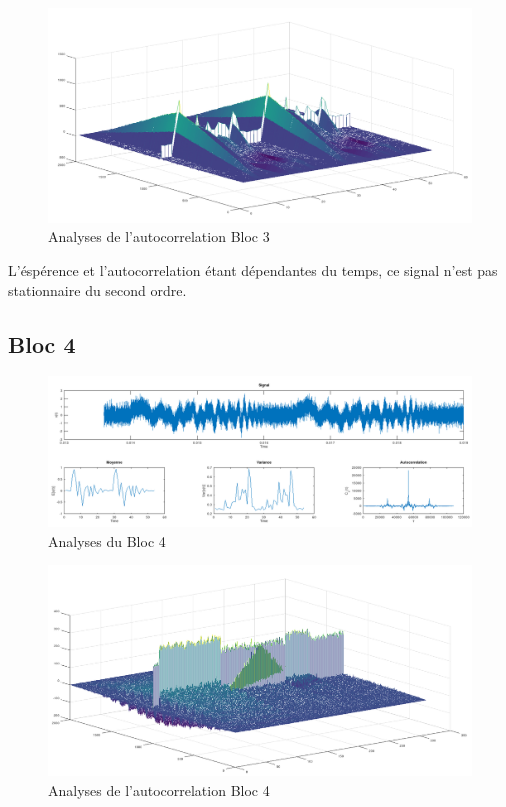 \documentclass[french, a4paper, 12pt, openany]{book}
\begin{document}
	\begin{figure}[ht]
		\begin{center}
		\includegraphics[scale=0.25]{images/AutoCorrBloc3.png}
		\end{center}
		\caption{Analyses de l'autocorrelation Bloc 3}
		\label{Analyses de l'autocorrelation Bloc 3}
	\end{figure}

	L'éspérence et l'autocorrelation étant dépendantes du temps, ce signal n'est pas stationnaire du second ordre.
  \subsection{Bloc 4}

	\begin{figure}[ht]
    \begin{center}
    \includegraphics[scale=0.25]{images/SignalBloc3.png}
    \end{center}
    \caption{Analyses du Bloc 4}
    \label{Analyses du Bloc 4}
  \end{figure}

	\begin{figure}[ht]
		\begin{center}
		\includegraphics[scale=0.25]{images/AutoCorrBloc4.png}
		\end{center}
		\caption{Analyses de l'autocorrelation Bloc 4}
		\label{Analyses de l'autocorrelation Bloc 4}
	\end{figure}
\end{document}
